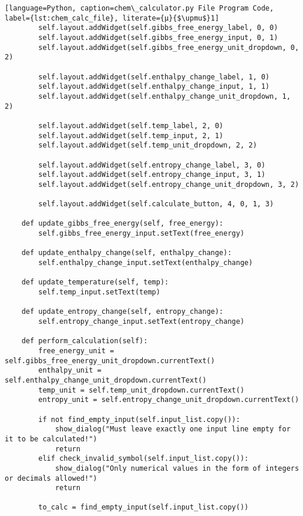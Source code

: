 \begin{lstlisting}[language=Python, caption=chem\_calculator.py File Program Code, label={lst:chem_calc_file}, literate={μ}{$\upmu$}1]
        self.layout.addWidget(self.gibbs_free_energy_label, 0, 0)
        self.layout.addWidget(self.gibbs_free_energy_input, 0, 1)
        self.layout.addWidget(self.gibbs_free_energy_unit_dropdown, 0, 2)

        self.layout.addWidget(self.enthalpy_change_label, 1, 0)
        self.layout.addWidget(self.enthalpy_change_input, 1, 1)
        self.layout.addWidget(self.enthalpy_change_unit_dropdown, 1, 2)

        self.layout.addWidget(self.temp_label, 2, 0)
        self.layout.addWidget(self.temp_input, 2, 1)
        self.layout.addWidget(self.temp_unit_dropdown, 2, 2)

        self.layout.addWidget(self.entropy_change_label, 3, 0)
        self.layout.addWidget(self.entropy_change_input, 3, 1)
        self.layout.addWidget(self.entropy_change_unit_dropdown, 3, 2)

        self.layout.addWidget(self.calculate_button, 4, 0, 1, 3)

    def update_gibbs_free_energy(self, free_energy):
        self.gibbs_free_energy_input.setText(free_energy)

    def update_enthalpy_change(self, enthalpy_change):
        self.enthalpy_change_input.setText(enthalpy_change)

    def update_temperature(self, temp):
        self.temp_input.setText(temp)

    def update_entropy_change(self, entropy_change):
        self.entropy_change_input.setText(entropy_change)

    def perform_calculation(self):
        free_energy_unit = self.gibbs_free_energy_unit_dropdown.currentText()
        enthalpy_unit = self.enthalpy_change_unit_dropdown.currentText()
        temp_unit = self.temp_unit_dropdown.currentText()
        entropy_unit = self.entropy_change_unit_dropdown.currentText()

        if not find_empty_input(self.input_list.copy()):
            show_dialog("Must leave exactly one input line empty for it to be calculated!")
            return
        elif check_invalid_symbol(self.input_list.copy()):
            show_dialog("Only numerical values in the form of integers or decimals allowed!")
            return

        to_calc = find_empty_input(self.input_list.copy())


\end{lstlisting}
